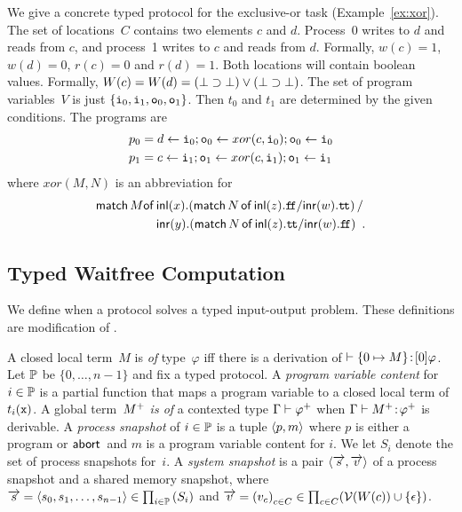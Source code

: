  \begin{example}
  \label{ex:xor-protocol}
  We give a concrete typed protocol for the exclusive-or task
  (Example~\ref{ex:xor}).
  The set of locations~$C$ contains two elements $c$ and $d$.
  Process~0 writes to $d$ and reads from $c$, and process~1
  writes to $c$ and reads from $d$.
  Formally, $w(c) = 1$, $w(d) = 0$, $r(c) = 0$ and $r(d) = 1$.
  Both locations will contain boolean values.
  Formally, $W(c) = W(d) = (\bot\supset\bot)\lor(\bot\supset\bot)$.
  The set of program variables~$V$ is just $\{\texttt{i}_0, \texttt{i}_1, \texttt{o}_0, \texttt{o}_1\}$.
  Then $t_0$ and $t_1$ are determined by the given conditions.
  The programs are
  \begin{align*}
   p_0 &= d\leftarrow \texttt{i}_0; \texttt{o}_0\leftarrow xor(c, \texttt{i}_0); \texttt{o}_0
   \leftarrow \texttt{i}_0 \\
   p_1 &= c\leftarrow \texttt{i}_1; \texttt{o}_1\leftarrow xor(c, \texttt{i}_1); \texttt{o}_1
   \leftarrow \texttt{i}_1
  \end{align*}
  where $xor(M,N)$ is an abbreviation for
  \begin{align*}
  \mathsf{match\,}{M}\mathsf{of}\,&\mathsf{inl}({x}).{
  (\mathsf{match}\,{N}\,\mathsf{of}\, \mathsf{inl}({z}). {\texttt{f\kern -1.7pt f}}/ \mathsf{inr}({w}). {\texttt{t\kern -1.2pt t}})
  }\,/\\ &\mathsf{inr}({y}).{
  (\mathsf{match}\,{N}\,\mathsf{of}\, \mathsf{inl}({z}). {\texttt{t\kern -1.2pt t}}/ \mathsf{inr}({w}). {\texttt{f\kern -1.7pt f}})
  }\enspace.
  \end{align*}
 \end{example}

\subsection{Typed Waitfree Computation}

We define when a protocol solves a typed
input-output problem.
These definitions are modification of \citet{Saks:1993vq}.

A closed local term~$M$ is \textit{of} type~$\varphi$ iff there is
a derivation of $\vdash {\{0\mapsto M\}} \mathord{\colon\kern -2pt}{[0]\varphi}$.
Let $\mathbb{P}$ be $\{0,\ldots, n-1\}$ and fix a typed protocol.
A \textit{program variable content} for
$i\in\mathbb{P}$ is a
partial function that maps a program variable to a closed local term of
$t_i(\texttt{x})$.
A global term~${M}^+$ \textit{is of} a contexted type $\Gamma\vdash{\varphi}^+$ when
$\Gamma\vdash{{M}^+} \mathord{\colon\kern -2pt}{{\varphi}^+}$ is derivable.
A \textit{process snapshot} of $i\in\mathbb{P}$ is a tuple
$\langle{p,m}\rangle$ where $p$ is either a program or $\mathsf{abort\,}$ and $m$ is a
program variable content for $i$.
We let $S_i$ denote the set of process snapshots for~$i$.
A \textit{system snapshot}
is a pair $\langle{\overrightarrow s, \overrightarrow v}\rangle$ of a process snapshot and a shared
memory snapshot, where $\overrightarrow s = \langle{s_0,
{s_1,{\ldots,s_{n-1}}}}\rangle \in
\prod_{i\in \mathbb{P}}\left(S_i\right)
$
and
$\overrightarrow v =
\left(v_c\right)_{c\in C} \in \prod_{c\in C}(\mathcal{V}(W(c))\cup\{\epsilon\})
$.

